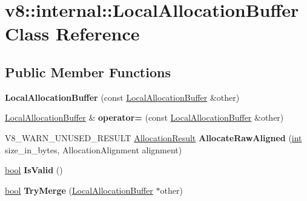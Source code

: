 \hypertarget{classv8_1_1internal_1_1LocalAllocationBuffer}{}\section{v8\+:\+:internal\+:\+:Local\+Allocation\+Buffer Class Reference}
\label{classv8_1_1internal_1_1LocalAllocationBuffer}
\subsection*{Public Member Functions}
\begin{DoxyCompactItemize}
\item 
\mbox{\label{classv8_1_1internal_1_1LocalAllocationBuffer_a5aee20bc9f715301f971efdb2a806ef8}} 
{\bfseries Local\+Allocation\+Buffer} (const \mbox{\hyperlink{classv8_1_1internal_1_1LocalAllocationBuffer}{Local\+Allocation\+Buffer}} \&other)
\item 
\mbox{\label{classv8_1_1internal_1_1LocalAllocationBuffer_a134eeb076046e18a302914be634e5b6f}} 
\mbox{\hyperlink{classv8_1_1internal_1_1LocalAllocationBuffer}{Local\+Allocation\+Buffer}} \& {\bfseries operator=} (const \mbox{\hyperlink{classv8_1_1internal_1_1LocalAllocationBuffer}{Local\+Allocation\+Buffer}} \&other)
\item 
\mbox{\label{classv8_1_1internal_1_1LocalAllocationBuffer_a0031615ada2211c96e55950f47546512}} 
V8\+\_\+\+W\+A\+R\+N\+\_\+\+U\+N\+U\+S\+E\+D\+\_\+\+R\+E\+S\+U\+LT \mbox{\hyperlink{classv8_1_1internal_1_1AllocationResult}{Allocation\+Result}} {\bfseries Allocate\+Raw\+Aligned} (\mbox{\hyperlink{classint}{int}} size\+\_\+in\+\_\+bytes, Allocation\+Alignment alignment)
\item 
\mbox{\label{classv8_1_1internal_1_1LocalAllocationBuffer_a0f679269a19bb2906f2faa291110c743}} 
\mbox{\hyperlink{classbool}{bool}} {\bfseries Is\+Valid} ()
\item 
\mbox{\label{classv8_1_1internal_1_1LocalAllocationBuffer_a18e56358625b165ec26a23d5b583c424}} 
\mbox{\hyperlink{classbool}{bool}} {\bfseries Try\+Merge} (\mbox{\hyperlink{classv8_1_1internal_1_1LocalAllocationBuffer}{Local\+Allocation\+Buffer}} $\ast$other)

\end{DoxyCompactItemize}
